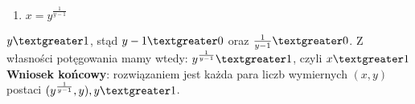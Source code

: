\documentclass[10pt,onecolumn]{article}
\begin{document}
\begin{enumerate}[(7)]
\item $x = y^{\frac{1}{y-1}}$\\
\end{enumerate}

$y \textgreater 1$, stąd $y-1 \textgreater 0$ oraz $\frac{1}{y-1} \textgreater 0$. Z własności potęgowania mamy wtedy: $y^{\frac{1}{y-1}} \textgreater 1$, czyli $x \textgreater 1$ \\

\textbf{Wniosek końcowy}: rozwiązaniem jest każda para liczb wymiernych $(x, y)$ postaci $(y^{\frac{1}{y-1}}, y), y \textgreater 1$. \\ \\ \\
\end{document}
